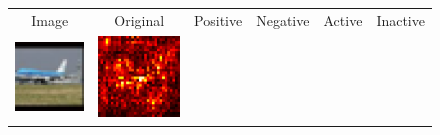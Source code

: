 \documentclass[preprint,12pt]{elsarticle}
\begin{document}
\begin{figure}[p]
  \centering
  \footnotesize
  \newcommand{\scale}{0.25}
  \setlength{\tabcolsep}{2pt}
  \begin{tabular}{cccccc}
  Image & Original & Positive & Negative & Active & Inactive \\
  
  \includegraphics[scale=\scale]{../visualizations/examples/cifar10/resnet18/images/0.png} &
  \includegraphics[scale=\scale]{../visualizations/examples/cifar10/resnet18/saliency_map/0.png} & 

\end{tabular}
\end{figure}
\end{document}
